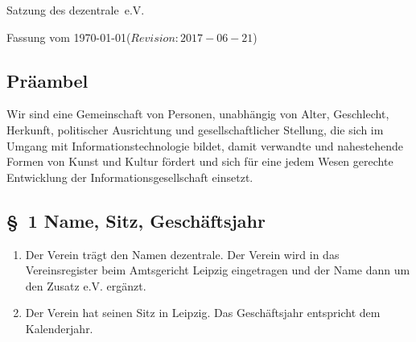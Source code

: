\documentclass[10pt,a4paper]{scrartcl}
\newcommand{\qs}[1]{\glqq#1\grqq}
\newcommand{\name}{dezentrale}
\newcommand{\revision}{$Revision: 2017-06-21 $}
\begin{document}
{\LARGE Satzung des \name\ e.V.}

Fassung vom \today (\revision)

\subsection*{Pr{\"a}ambel}



Wir sind eine Gemeinschaft von Personen, unabh{\"a}ngig von Alter,
Geschlecht, Herkunft, politischer Ausrichtung und gesellschaftlicher
Stellung, die sich im Umgang mit Informationstechnologie bildet, damit
verwandte und nahestehende Formen von Kunst und Kultur f{\"o}rdert und sich f{\"u}r
eine jedem Wesen gerechte Entwicklung der Informationsgesellschaft
einsetzt.
%
%
\subsection*{\S \ 1 Name, Sitz, Gesch{\"a}ftsjahr}
\begin{enumerate}
\item Der Verein tr{\"a}gt den Namen \qs{\name}. Der Verein wird in das
Vereinsregister beim Amtsgericht Leipzig eingetragen
und der Name dann um den Zusatz \qs{e.V.} erg{\"a}nzt.
\item Der Verein hat seinen Sitz in Leipzig. Das Gesch{\"a}ftsjahr entspricht
dem Kalenderjahr.
\end{enumerate}
%
%
\end{document}
